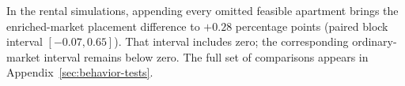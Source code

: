 In the rental simulations, appending every omitted feasible apartment brings the enriched-market placement difference to $+0.28$ percentage points (paired block interval $[-0.07,0.65]$). That interval includes zero; the corresponding ordinary-market interval remains below zero. The full set of comparisons appears in Appendix~\ref{sec:behavior-tests}.
